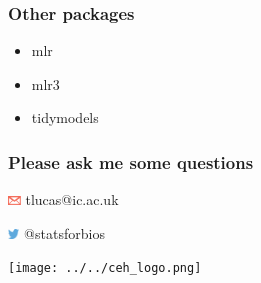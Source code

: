 \documentclass[handout, aspectratio = 169]{beamer}
\begin{document}
\begin{frame}
\frametitle{Other packages}
\begin{itemize}
\item mlr
\item mlr3
\item tidymodels
\end{itemize}

\end{frame} 


    
\begin{frame}

\frametitle{Please ask me some questions}

\vspace{5mm}


\vspace{4mm}

\includegraphics[height=7pt]{Ar_Icon_Contact.pdf} tlucas{\footnotesize{@}}ic.ac.uk

\includegraphics[height=7pt]{Twitter_logo_blue-small.png} {\footnotesize{@}}statsforbios

\vspace{2cm}
\hfill %
\texttt{[image: ../../ceh\_logo.png]}

\end{frame}




 
\end{document}
